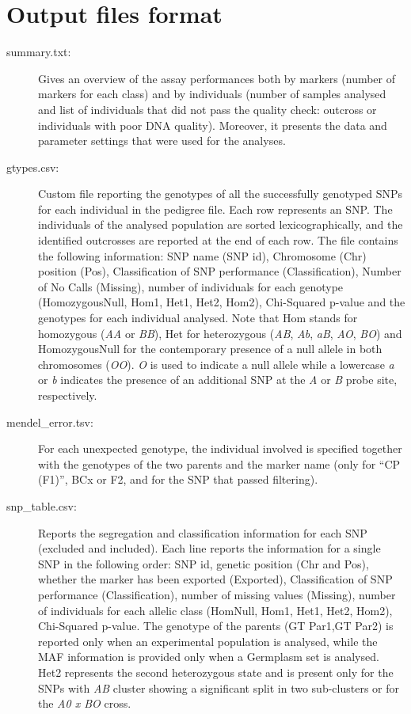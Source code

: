 \documentclass[a4paper,11pt,english]{article}
\begin{document}
\section{Output files format}
\label{index:output-files-format}
\begin{description}
 \item [summary.txt:] Gives an overview of the assay performances both
by markers (number of markers for each class) and by individuals
(number of samples analysed and list of individuals that did not pass
the quality check: outcross or individuals with poor DNA quality).  Moreover,
it presents the data and parameter settings that were used for the analyses.

\item [gtypes.csv:] Custom file reporting the genotypes of all the successfully genotyped
SNPs
for each individual in the pedigree file. Each row represents an SNP. The individuals of
the analysed population are sorted lexicographically, and the identified outcrosses are reported at
the end of each row. The file contains the following information:
SNP name (SNP id), Chromosome (Chr) position (Pos), Classification of SNP performance (Classification),
Number of No Calls (Missing), number of individuals for each genotype (HomozygousNull, Hom1,
Het1, Het2, Hom2), Chi-Squared p-value and the genotypes for each individual analysed.
Note that Hom stands for homozygous (\emph{AA} or \emph{BB}), Het for heterozygous (\emph{AB}, \emph{Ab}, \emph{aB}, \emph{AO}, \emph{BO})
and HomozygousNull for the contemporary presence of a null allele in both
chromosomes (\emph{OO}). \emph{O} is used to indicate a null allele while a lowercase \emph{a} or
\emph{b} indicates the presence of an additional SNP at the \emph{A} or \emph{B} probe site,
respectively.

\item [mendel\_error.tsv:] For each unexpected genotype, the individual involved is
specified together
with the genotypes of the two parents and the marker name (only for ``CP (F1)'', BCx or F2, and for
the SNP that passed filtering).

\item [snp\_table.csv:] Reports the segregation and classification information for each
SNP
(excluded and included). Each line reports the information for a single SNP in the following order:
SNP id, genetic position (Chr and Pos), whether the marker has been exported (Exported),
Classification of SNP performance (Classification), number of missing values (Missing), number of
individuals
for each allelic class (HomNull, Hom1, Het1, Het2, Hom2), Chi-Squared p-value. The genotype of the
parents (GT Par1,GT Par2) is reported  only when an experimental population is analysed, while
the MAF information is provided only when a
Germplasm set is analysed. Het2 represents the second heterozygous
state and is present only for the SNPs with \emph{AB} cluster showing a significant split in two
sub-clusters or for the \emph{A0 x BO}  cross.


\end{description}
\end{document}
